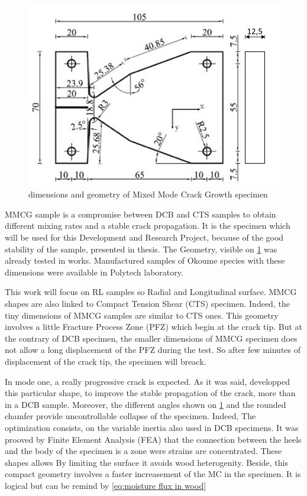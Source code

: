 \begin{figure}[th]
	\centering
	\includegraphics[scale=1.1]{Figures/MMCG_specimen}
	\decoRule
	\caption[MMCG specimen]{dimensions and geometry of Mixed Mode Crack Growth specimen}
	\label{fig:Fig5}
\end{figure}
MMCG sample is a compromise between DCB and CTS samples to obtain different mixing rates and a stable crack propagation. It is the specimen which will be used for this Development and Research Project, because of the good stability of the sample, presented in \parencite{Reference6} thesis. The Geometry, visible on \ref{fig:Fig5} was already tested in \parencite{Reference7} works. Manufactured samples of Okoume species with these dimensions were available in Polytech laboratory.

This work will focus on RL samples so Radial and Longitudinal surface. MMCG shapes are also linked to Compact Tension Shear (CTS) specimen. Indeed, the tiny dimensions of MMCG samples are similar to CTS ones. This geometry involves a little Fracture Process Zone (PFZ) which begin at the crack tip. But at the contrary of DCB specimen, the smaller dimensions of MMCG specimen does not allow a long displacement of the PFZ during the test. So after few minutes of displacement of the crack tip, the specimen will breack.

In mode one, a really progressive crack is expected. As it was said, \parencite{Reference6} developped this particular shape, to improve the stable propagation of the crack, more than in a DCB sample. Moreover, the different angles shown on \ref{fig:Fig5} and the rounded chamfer provide uncontrollable collapse of the specimen. Indeed, The optimization consists, on the variable inertia also used in DCB specimens. It was prooved by Finite Element Analysis (FEA) that the connection between the heels and the body of the specimen is a zone were strains are concentrated. These shapes allows By limiting the surface it avoids wood heterogenity. Beside, this compact geometry involves a faster increasement of the MC in the specimen. It is logical but can be remind by \ref{eq:moisture flux in wood}

